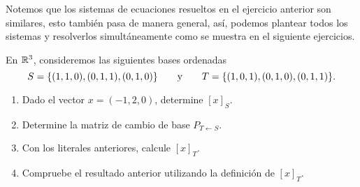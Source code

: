 \documentclass[a4,11pt]{aleph-notas}
\begin{document}
\begin{advertencia}
    Notemos que los sistemas de ecuaciones resueltos en el ejercicio anterior son similares, esto también pasa de manera general, así, podemos plantear todos los sistemas y resolverlos simultáneamente como se muestra en el siguiente ejercicios.
\end{advertencia}

\begin{ejer}
    En $\mathbb{R}^3$, consideremos las siguientes bases ordenadas
    \[
        S = \{(1,1,0),(0,1,1),(0,1,0)\}
        \qquad\text{y}\qquad
        T = \{(1,0,1),(0,1,0),(0,1,1)\}.
    \]
    \begin{enumerate}
    \item 
        Dado el vector $x = (-1,2,0)$, determine $[x]_S$.
    \item
        Determine la matriz de cambio de base $P_{T \leftarrow S}$.
    \item
        Con los literales anteriores, calcule $[x]_T$.
    \item
        Compruebe el resultado anterior utilizando la definición de $[x]_T$.
    \end{enumerate} 
\end{ejer}
\end{document}
